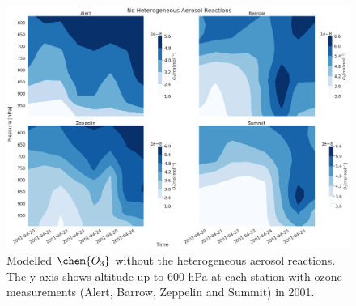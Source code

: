 \begin{figure}
    \centering
    \includegraphics[width = \linewidth]{Chapter6_Results/images/noAerosol_2001_o3.png}
    \caption{Modelled $\chem{O_3}$ without the heterogeneous aerosol reactions. The y-axis shows altitude up to 600 hPa at each station with ozone measurements (Alert, Barrow, Zeppelin and Summit) in 2001.}
    \label{fig:vert_noAer_o3_2001}
\end{figure}